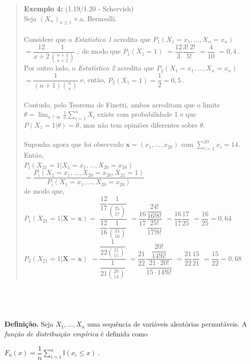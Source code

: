 \documentclass[
]{book}
\begin{document}
\begin{quote}
\textbf{Exemplo 4:} (1.19/1.20 - Schervish)\\
Seja \(\left(X_n\right)_{n\geq 1}\) v.a. Bernoulli.\\
\(~\)\\
Considere que o \emph{Estatístico 1} acredita que \(P_1(X_1=x_1,\ldots,X_n=x_n)\) \(=\dfrac{12}{x+2}\dfrac{1}{\binom{n+4}{x+2}}~,\) de modo que \(P_1(X_1=1)\) \(=\dfrac{12}{3}\dfrac{3!~2!}{5!}\) \(=\dfrac{4}{10}\) \(=0,4~.\)\\
Por outro lado, o \emph{Estatístico 2} acredita que \(P_2(X_1=x_1,\ldots,X_n=x_n)\) \(=\dfrac{1}{(n+1)\binom{n}{x}}\) e, então, \(P_2(X_1=1)=\dfrac{1}{2}=0,5~.\)\\
\(~\)\\
Contudo, pelo Teorema de Finetti, ambos acreditam que o limite \(\theta=\displaystyle\lim_{n\uparrow\infty}\frac{1}{n}\sum_{i=1}^nX_i\) existe com probabilidade 1 e que \(P(X_1=1|\theta)=\theta\), mas não tem opiniões diferentes sobre \(\theta\).\\
\(~\)\\
Suponha agora que foi observado \(\boldsymbol{x}=(x_1,\ldots,x_{20})\) com \(\displaystyle\sum_{i=1}^{20}x_i=14\). Então,\\
\(P_i(X_{21}=1|X_1=x_1,\ldots,X_{20}=x_{20})\) \(=\dfrac{P_i(X_1=x_1,\ldots,X_{20}=x_{20},X_{21}=1)}{P_i(X_1=x_1,\ldots,X_{20}=x_{20})}\)\\
de modo que,\\
\(P_1(X_{21}=1|\mathbf X=\mathbf x)=\) \(\dfrac{\dfrac{12}{17}\dfrac{1}{\binom{25}{17}}}{\dfrac{12}{16}\dfrac{1}{\binom{24}{16}}}\) \(=\dfrac{16}{17}\dfrac{\dfrac{24!}{16!8!}}{\dfrac{25!}{17!8!}}\) \(=\dfrac{16}{17}\dfrac{17}{25}\) \(=\dfrac{16}{25}=0,64\)\\
\(P_2(X_{21}=1|\mathbf X=\mathbf x)\) \(=\dfrac{\dfrac{1}{22\binom{21}{15}}}{\dfrac{1}{21\binom{20}{14}}}\) \(=\dfrac{21}{22}\dfrac{\dfrac{20!}{14!6!}}{\dfrac{21\cdot20!}{15\cdot 14!6!}}\) \(=\dfrac{21}{22}\dfrac{15}{21}\) \(=\dfrac{15}{22}=0,68\)
\end{quote}

\(~\)

\(~\)

\textbf{Definição.} Seja \(X_1,\ldots,X_n\) uma sequência de variáveis aleatórias permutáveis. A \emph{função de distribuição empírica} é definida como

\(F_n(x) = \displaystyle\dfrac{1}{n}\sum_{i=1}^{n} \mathbb{I}(x_i\leq x)~.\)

\(~\)
\end{document}
